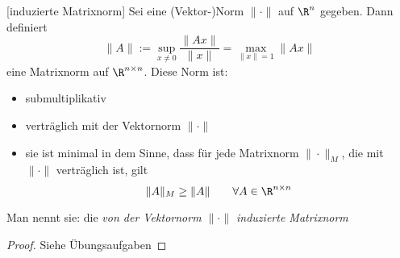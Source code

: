 \documentclass{mycourse}
\begin{document}
\begin{st}
	\label{st:2.12}[induzierte Matrixnorm]
Sei eine (Vektor-)Norm $\|\cdot\|$ auf $\R^n$ gegeben.
Dann definiert
\[
\|A\|:=\sup_{x\neq 0}\frac{\|Ax\|}{\|x\|} = \max_{\|x\|=1}\|Ax\|
\]
eine Matrixnorm auf $\R^{n\times n}$.
Diese Norm ist:
\begin{itemize}
\item submultiplikativ
\item verträglich mit der Vektornorm $\|\cdot\|$
\item sie ist minimal in dem Sinne, dass für jede Matrixnorm $\|\cdot\|_M$, die mit $\|\cdot\|$ verträglich ist, gilt
\[
\|A\|_M\ge \|A\| \qquad \forall A\in\R^{n\times n}
\]
\end{itemize}
\begin{note}
Man nennt sie: die \emph{von der Vektornorm $\|\cdot\|$ induzierte Matrixnorm}
\end{note}
\begin{proof}
Siehe Übungsaufgaben
\end{proof}
\end{st}
\end{document}
